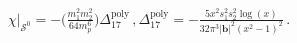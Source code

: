 \begin{align}
    \begin{split} \label{eqt11}   
     \chi\Big|_{\mathcal{S}^0}=-\Big(\frac{ m_1^2 m_2^2}{64 m_p^6}\Big)\Delta_{\mathfrak{17}}^{\textrm{poly}}\,, \Delta_{\mathfrak{17}}^{\textrm{poly}}=-\frac{5 x^2s_1^2 s_2^2 \log (x)}{32 \pi ^3 |\boldsymbol{b}|^2 \left(x^2-1\right)^2}\,.
        \end{split}
\end{align}
